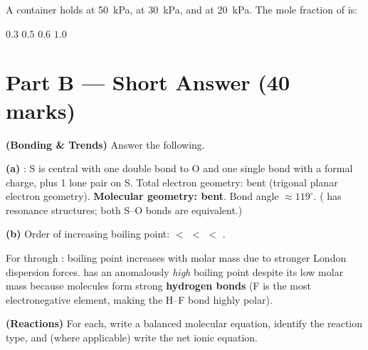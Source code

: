 \documentclass[addpoints]{exam}
\begin{document}
\begin{questions}
\question[1] A container holds  at \SI{50}{kPa},  at \SI{30}{kPa}, and
 at \SI{20}{kPa}. The mole fraction of  is:
\begin{choices}
    \choice $0.3$
    \correctchoice $0.5$
    \choice $0.6$
    \choice $1.0$
\end{choices}


\section*{Part B --- Short Answer (40 marks)}

\question \textbf{(Bonding \& Trends)} Answer the following.
\begin{solution}[9cm]
\textbf{(a)} : S is central with one double bond to O and one single bond with a
formal charge, plus 1 lone pair on S. Total electron geometry: bent (trigonal planar electron
geometry). \textbf{Molecular geometry: bent}. Bond angle $\approx 119^\circ$.
( has resonance structures; both S--O bonds are equivalent.)

\textbf{(b)} Order of increasing boiling point:  $<$  $<$  $<$ .

For  through : boiling point increases with molar mass due to stronger London
dispersion forces.  has an anomalously \textit{high} boiling point despite its low molar
mass because  molecules form strong \textbf{hydrogen bonds} (F is the most
electronegative element, making the H--F bond highly polar).
\end{solution}

\question \textbf{(Reactions)} For each, write a balanced molecular equation, identify
the reaction type, and (where applicable) write the net ionic equation.
\begin{parts}

\end{parts}
\end{questions}
\end{document}

